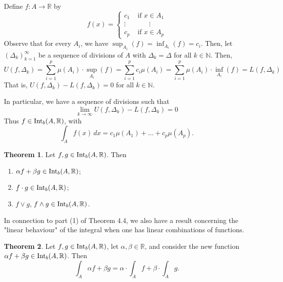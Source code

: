 \documentclass[11pt]{article}
\theoremstyle{definition}
\newtheorem{thm}{Theorem}[section]
\newcommand{\N}{\ensuremath{\mathbb{N}}}
\newcommand{\R}{\ensuremath{\mathbb{R}}}
\begin{document}
Define $f : A \to \R$ by 
$$f(x) = \begin{cases} c_1 & \text{ if } x \in A_1 \\
\vdots & \quad\quad\vdots \\
c_p & \text{ if } x \in A_p \end{cases}$$
Observe that for every $A_i$, we have $\sup_{A_i}(f) = \inf_{A_i}(f) = c_i$. Then, let $(\Delta_k)_{k=1}^\infty$ be a sequence of divisions of $A$ with $\Delta_k = \Delta$ for all $k \in \N$. Then,
$$U(f, \Delta_k) = \sum_{i=1}^p \mu(A_i) \cdot \sup_{A_i}(f) = \sum_{i=1}^p c_i \mu(A_i) = \sum_{i=1}^p \mu(A_i) \cdot \inf_{A_i}(f) = L(f, \Delta_k)$$
That is, $U(f, \Delta_k) - L(f, \Delta_k) = 0$ for all $k \in \N$. 

In particular, we have a sequence of divisions such that
$$\lim_{k\to\infty} U(f, \Delta_k) - L(f, \Delta_k) = 0$$
Thus $f \in {\rm Int}_b (A, \R)$, with 
$$\int_A f(x)\,dx = c_1 \mu(A_1) + \dots + c_p \mu(A_p).$$

\begin{thm} 
Let $f, g \in {\rm Int}_b(A, \R)$. Then \vspace{-1.5ex}
\begin{enumerate}[(1)]
\item $\alpha f + \beta g \in {\rm Int}_b(A, \R)$;
\item $f \cdot g \in {\rm Int}_b(A, \R)$;
\item $f \vee g$, $f \wedge g \in {\rm Int}_b(A, \R)$.
\end{enumerate}
\end{thm}

In connection to part (1) of Theorem 4.4, we also have a result concerning the "linear behaviour" of the integral when one has linear combinations of functions.

\begin{thm}
Let $f, g \in {\rm Int}_b(A, \R)$, let $\alpha, \beta \in \R$, and consider the new function $\alpha f + \beta g \in {\rm Int}_b(A, \R)$. Then
$$\int_A \alpha f + \beta g = \alpha \cdot \int_A f + \beta \cdot \int_A g.$$
\end{thm}
\end{document}
